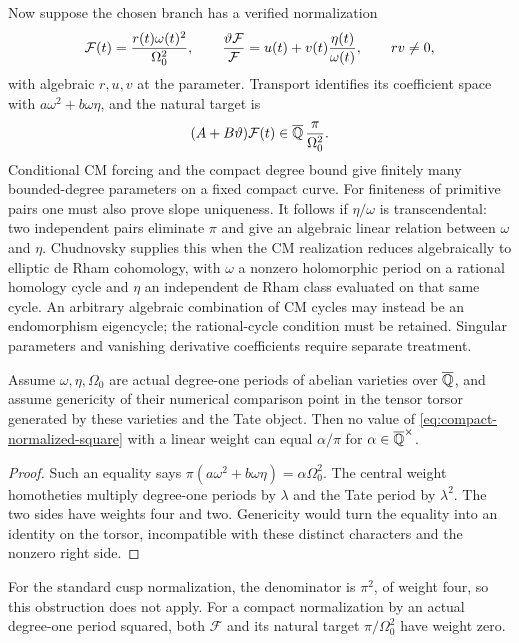 Now suppose the chosen branch has a verified normalization
\begin{equation}\label{eq:compact-normalized-square}
 \mathcal F(t)=\frac{r(t)\omega(t)^2}{\Omega_0^2},\qquad
 \frac{\vartheta\mathcal F}{\mathcal F}
       =u(t)+v(t)\frac{\eta(t)}{\omega(t)},\qquad rv\ne0,
\end{equation}
with algebraic $r,u,v$ at the parameter. Transport identifies its
coefficient space with $a\omega^2+b\omega\eta$, and the natural
target is
\begin{equation}\label{eq:compact-natural-target}
 (A+B\vartheta)\mathcal F(t)\in\overline{\mathbb Q}\,\frac{\pi}{\Omega_0^2}.
\end{equation}
Conditional CM forcing and the compact degree bound give finitely many
bounded-degree parameters on a fixed compact curve. For finiteness of
primitive pairs one must also prove slope uniqueness. It follows if
$\eta/\omega$ is transcendental: two independent pairs eliminate
$\pi$ and give an algebraic linear relation between $\omega$ and
$\eta$. Chudnovsky supplies this when the CM realization reduces
algebraically to elliptic de Rham cohomology, with $\omega$ a nonzero
holomorphic period on a rational homology cycle and $\eta$ an independent
de Rham class evaluated on that same cycle. An arbitrary algebraic
combination of CM cycles may instead be an endomorphism eigencycle;
the rational-cycle condition must be retained. Singular parameters
and vanishing derivative coefficients require separate treatment.

\begin{proposition}
\label{prop:compact-weight-obstruction}
Assume $\omega,\eta,\Omega_0$ are actual degree-one periods of abelian
varieties over $\overline{\mathbb Q}$, and assume genericity of their numerical
comparison point in the tensor torsor generated by these varieties
and the Tate object. Then no value of
\eqref{eq:compact-normalized-square} with a linear weight can equal
$\alpha/\pi$ for $\alpha\in\overline{\mathbb Q}^\times$.
\end{proposition}
\begin{proof}
Such an equality says
$\pi(a\omega^2+b\omega\eta)=\alpha\Omega_0^2$.
The central weight homotheties multiply degree-one periods by
$\lambda$ and the Tate period by $\lambda^2$. The two sides have
weights four and two. Genericity would turn the equality into an
identity on the torsor, incompatible with these distinct characters
and the nonzero right side.
\end{proof}
For the standard cusp normalization, the denominator is $\pi^2$,
of weight four, so this obstruction does not apply. For a compact
normalization by an actual degree-one period squared, both
$\mathcal F$ and its natural target $\pi/\Omega_0^2$ have weight zero.

